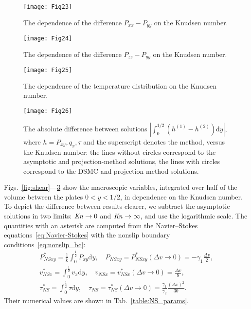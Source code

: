 \documentclass[review]{elsarticle}
\newcommand{\Kn}{\mbox{\textit{Kn}}}
\newcommand{\NS}{N\!S}
\newcommand{\dd}{\mathrm{d}}
\begin{document}
\begin{figure}
    \centering
    \texttt{[image: Fig23]}
    \caption{The dependence of the difference \(P_{xx}-P_{yy}\) on the Knudsen number.}
    \label{fig:pxx}
\end{figure}

\begin{figure}
    \centering
    \texttt{[image: Fig24]}
    \caption{The dependence of the difference \(P_{zz}-P_{yy}\) on the Knudsen number.}
    \label{fig:pzz}
\end{figure}

\begin{figure}
    \centering
    \texttt{[image: Fig25]}
    \caption{The dependence of the temperature distribution on the Knudsen number.}
    \label{fig:temp}
\end{figure}

\begin{figure}
    \centering
    \texttt{[image: Fig26]}
    \caption{The absolute difference between solutions \(|\int_0^{1/2} (h^{(1)}-h^{(2)})\dd{y}|\),
        where \(h = P_{xy}, q_x, \tau\) and the superscript denotes the method, versus the Knudsen number:
        the lines without circles correspond to the asymptotic and projection-method solutions,
        the lines with circles correspond to the DSMC and projection-method solutions.}
    \label{fig:diff}
\end{figure}

Figs.~\ref{fig:shear}---\ref{fig:temp} show the macroscopic variables,
integrated over half of the volume between the plates \(0<y<1/2\), in dependence on the Knudsen number.
To depict the difference between results clearer,
we subtract the asymptotic solutions in two limits: \(\Kn\to0\) and \(\Kn\to\infty\),
and use the logarithmic scale.
The quantities with an asterisk are computed from the Navier--Stokes equations~\eqref{eq:Navier-Stokes}
with the nonslip boundary conditions~\eqref{eq:nonslip_bc}:
\begin{gather*}
    P_{\NS xy}^* = \frac1k \int_0^\frac12 P_{xy} \dd{y}, \quad P_{\NS xy} = P_{\NS xy}^*(\Delta{v}\to0) = -\gamma_1\frac{\Delta{v}}2, \\
    v_{\NS x}^* = \int_0^\frac12 v_x \dd{y}, \quad v_{\NS x} = v_{\NS x}^*(\Delta{v}\to0) = \frac{\Delta{v}}8, \\
    \tau_{\NS}^* = \int_0^\frac12 \tau \dd{y}, \quad
        \tau_{\NS} = \tau_{\NS}^*(\Delta{v}\to0) = \frac{\gamma_1}{\gamma_2}\frac{(\Delta{v})^2}{30}.
\end{gather*}
Their numerical values are shown in Tab.~\ref{table:NS_params}.
\end{document}
